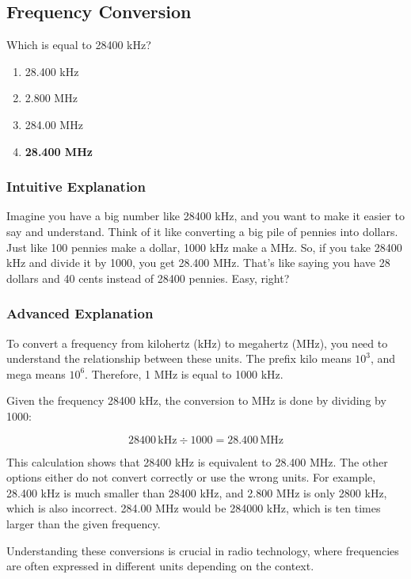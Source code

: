 \subsection{Frequency Conversion}\label{T5B12}

\begin{tcolorbox}[colback=gray!10!white,colframe=black!75!black,title=T5B12]
Which is equal to 28400 kHz?
\begin{enumerate}[label=\Alph*)]
    \item 28.400 kHz
    \item 2.800 MHz
    \item 284.00 MHz
    \item \textbf{28.400 MHz}
\end{enumerate}
\end{tcolorbox}

\subsubsection{Intuitive Explanation}
Imagine you have a big number like 28400 kHz, and you want to make it easier to say and understand. Think of it like converting a big pile of pennies into dollars. Just like 100 pennies make a dollar, 1000 kHz make a MHz. So, if you take 28400 kHz and divide it by 1000, you get 28.400 MHz. That's like saying you have 28 dollars and 40 cents instead of 28400 pennies. Easy, right?

\subsubsection{Advanced Explanation}
To convert a frequency from kilohertz (kHz) to megahertz (MHz), you need to understand the relationship between these units. The prefix kilo means $10^3$, and mega means $10^6$. Therefore, 1 MHz is equal to 1000 kHz. 

Given the frequency 28400 kHz, the conversion to MHz is done by dividing by 1000:

\[
28400 \, \text{kHz} \div 1000 = 28.400 \, \text{MHz}
\]

This calculation shows that 28400 kHz is equivalent to 28.400 MHz. The other options either do not convert correctly or use the wrong units. For example, 28.400 kHz is much smaller than 28400 kHz, and 2.800 MHz is only 2800 kHz, which is also incorrect. 284.00 MHz would be 284000 kHz, which is ten times larger than the given frequency.

Understanding these conversions is crucial in radio technology, where frequencies are often expressed in different units depending on the context.

